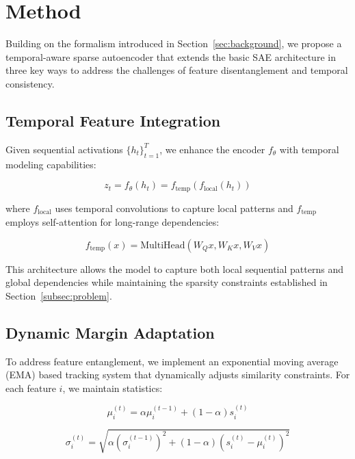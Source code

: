 \documentclass{article} %
\begin{document}
\section{Method}
\label{sec:method}

Building on the formalism introduced in Section~\ref{sec:background}, we propose a temporal-aware sparse autoencoder that extends the basic SAE architecture in three key ways to address the challenges of feature disentanglement and temporal consistency.

\subsection{Temporal Feature Integration}
Given sequential activations $\{h_t\}_{t=1}^T$, we enhance the encoder $f_\theta$ with temporal modeling capabilities:

\begin{equation}
    z_t = f_\theta(h_t) = f_\text{temp}(f_\text{local}(h_t))
\end{equation}

where $f_\text{local}$ uses temporal convolutions to capture local patterns and $f_\text{temp}$ employs self-attention for long-range dependencies:

\begin{equation}
    f_\text{temp}(x) = \text{MultiHead}(W_Q x, W_K x, W_V x)
\end{equation}

This architecture allows the model to capture both local sequential patterns and global dependencies while maintaining the sparsity constraints established in Section~\ref{subsec:problem}.

\subsection{Dynamic Margin Adaptation}
To address feature entanglement, we implement an exponential moving average (EMA) based tracking system that dynamically adjusts similarity constraints. For each feature $i$, we maintain statistics:

\begin{equation}
    \mu_i^{(t)} = \alpha\mu_i^{(t-1)} + (1-\alpha)s_i^{(t)}
\end{equation}

\begin{equation}
    \sigma_i^{(t)} = \sqrt{\alpha(\sigma_i^{(t-1)})^2 + (1-\alpha)(s_i^{(t)} - \mu_i^{(t)})^2}
\end{equation}
\end{document}
